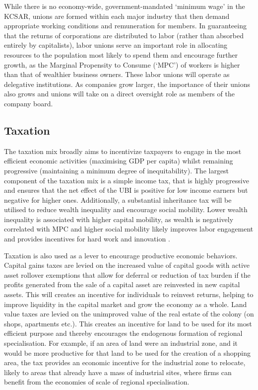 \documentclass[fleqn,10pt]{Stylesheet} %
\begin{document}
While there is no economy-wide, government-mandated ‘minimum wage’ in the KCSAR, unions are formed within each major industry that then demand appropriate working conditions and remuneration for members. In guaranteeing that the returns of corporations are distributed to labor (rather than absorbed entirely by capitalists), labor unions serve an important role in allocating resources to the population most likely to spend them and encourage further growth, as the Marginal Propensity to Consume (‘MPC’) of workers is higher than that of wealthier business owners. These labor unions will operate as delegative institutions. As companies grow larger, the importance of their unions also grows and unions will take on a direct oversight role as members of the company board. 

\subsection{Taxation}
The taxation mix broadly aims to incentivize taxpayers to engage in the most efficient economic activities (maximising GDP per capita) whilst remaining progressive (maintaining a minimum degree of inequitability). The largest component of the taxation mix is a simple income tax, that is highly progressive and ensures that the net effect of the UBI is positive for low income earners but negative for higher ones. Additionally, a substantial inheritance tax will be utilised to reduce wealth inequality and encourage social mobility. Lower wealth inequality is associated with higher capital mobility, as wealth is negatively correlated with MPC and higher social mobility likely improves labor engagement and provides incentives for hard work and innovation \cite{Brueckner-2018}.

Taxation is also used as a lever to encourage productive economic behaviors. Capital gains taxes are levied on the increased value of capital goods with active asset rollover exemptions that allow for deferral or reduction of tax burden if the profits generated from the sale of a capital asset are reinvested in new capital assets. This will creates an incentive for individuals to reinvest returns, helping to improve liquidity in the capital market and grow the economy as a whole. Land value taxes are levied on the unimproved value of the real estate of the colony (on shops, apartments etc.). This creates an incentive for land to be used for its most efficient purpose and thereby encourages the endogenous formation of regional specialisation. For example, if an area of land were an industrial zone, and it would be more productive for that land to be used for the creation of a shopping area, the tax provides an economic incentive for the industrial zone to relocate, likely to areas that already have a mass of industrial sites, where firms can benefit from the economies of scale of regional specialisation.
\end{document}
